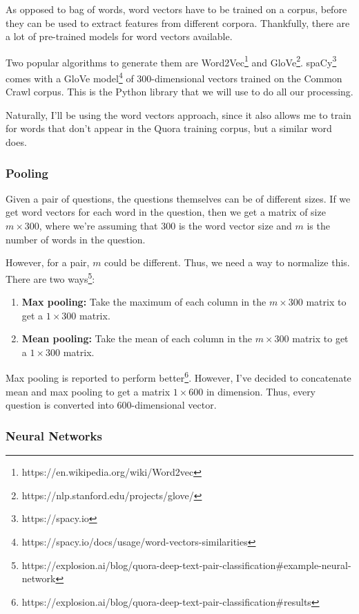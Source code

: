 \documentclass{article}
\begin{document}
As opposed to bag of words, word vectors have to be trained on a corpus, before they can be used to extract features from different corpora. Thankfully, there are a lot of pre-trained models for word vectors available.

Two popular algorithms to generate them are Word2Vec\footnote{https://en.wikipedia.org/wiki/Word2vec} and GloVe\footnote{https://nlp.stanford.edu/projects/glove/}. spaCy\footnote{https://spacy.io} comes with a GloVe model\footnote{https://spacy.io/docs/usage/word-vectors-similarities} of 300-dimensional vectors trained on the Common Crawl corpus. This is the Python library that we will use to do all our processing.

Naturally, I'll be using the word vectors approach, since it also allows me to train for words that don't appear in the Quora training corpus, but a similar word does.

\subsubsection{Pooling}

Given a pair of questions, the questions themselves can be of different sizes. If we get word vectors for each word in the question, then we get a matrix of size $m \times 300$, where we're assuming that $300$ is the word vector size and $m$ is the number of words in the question.

However, for a pair, $m$ could be different. Thus, we need a way to normalize this. There are two ways\footnote{https://explosion.ai/blog/quora-deep-text-pair-classification\#example-neural-network}:

\begin{enumerate}
\item{\textbf{Max pooling:} Take the maximum of each column in the $m \times 300$ matrix to get a $1 \times 300$ matrix.}
\item{\textbf{Mean pooling:} Take the mean of each column in the $m \times 300$ matrix to get a $1 \times 300$ matrix.}
\end{enumerate}

Max pooling is reported to perform better\footnote{https://explosion.ai/blog/quora-deep-text-pair-classification\#results}. However, I've decided to concatenate mean and max pooling to get a matrix $1 \times 600$ in dimension. Thus, every question is converted into 600-dimensional vector.

\subsubsection{Neural Networks}
\end{document}
